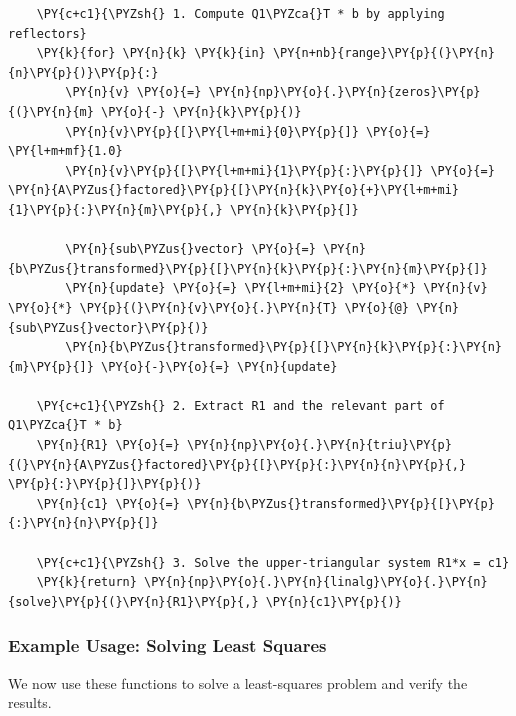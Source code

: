 \begin{verbatim}
    \PY{c+c1}{\PYZsh{} 1. Compute Q1\PYZca{}T * b by applying reflectors}
    \PY{k}{for} \PY{n}{k} \PY{k}{in} \PY{n+nb}{range}\PY{p}{(}\PY{n}{n}\PY{p}{)}\PY{p}{:}
        \PY{n}{v} \PY{o}{=} \PY{n}{np}\PY{o}{.}\PY{n}{zeros}\PY{p}{(}\PY{n}{m} \PY{o}{-} \PY{n}{k}\PY{p}{)}
        \PY{n}{v}\PY{p}{[}\PY{l+m+mi}{0}\PY{p}{]} \PY{o}{=} \PY{l+m+mf}{1.0}
        \PY{n}{v}\PY{p}{[}\PY{l+m+mi}{1}\PY{p}{:}\PY{p}{]} \PY{o}{=} \PY{n}{A\PYZus{}factored}\PY{p}{[}\PY{n}{k}\PY{o}{+}\PY{l+m+mi}{1}\PY{p}{:}\PY{n}{m}\PY{p}{,} \PY{n}{k}\PY{p}{]}

        \PY{n}{sub\PYZus{}vector} \PY{o}{=} \PY{n}{b\PYZus{}transformed}\PY{p}{[}\PY{n}{k}\PY{p}{:}\PY{n}{m}\PY{p}{]}
        \PY{n}{update} \PY{o}{=} \PY{l+m+mi}{2} \PY{o}{*} \PY{n}{v} \PY{o}{*} \PY{p}{(}\PY{n}{v}\PY{o}{.}\PY{n}{T} \PY{o}{@} \PY{n}{sub\PYZus{}vector}\PY{p}{)}
        \PY{n}{b\PYZus{}transformed}\PY{p}{[}\PY{n}{k}\PY{p}{:}\PY{n}{m}\PY{p}{]} \PY{o}{-}\PY{o}{=} \PY{n}{update}

    \PY{c+c1}{\PYZsh{} 2. Extract R1 and the relevant part of Q1\PYZca{}T * b}
    \PY{n}{R1} \PY{o}{=} \PY{n}{np}\PY{o}{.}\PY{n}{triu}\PY{p}{(}\PY{n}{A\PYZus{}factored}\PY{p}{[}\PY{p}{:}\PY{n}{n}\PY{p}{,} \PY{p}{:}\PY{p}{]}\PY{p}{)}
    \PY{n}{c1} \PY{o}{=} \PY{n}{b\PYZus{}transformed}\PY{p}{[}\PY{p}{:}\PY{n}{n}\PY{p}{]}

    \PY{c+c1}{\PYZsh{} 3. Solve the upper-triangular system R1*x = c1}
    \PY{k}{return} \PY{n}{np}\PY{o}{.}\PY{n}{linalg}\PY{o}{.}\PY{n}{solve}\PY{p}{(}\PY{n}{R1}\PY{p}{,} \PY{n}{c1}\PY{p}{)}
\end{verbatim}

\subsubsection*{Example Usage: Solving Least Squares}
We now use these functions to solve a least-squares problem and verify the results.


